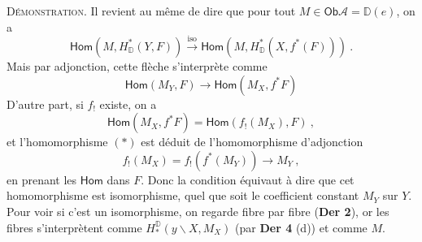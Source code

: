 \documentclass[11pt]{article}
\newcommand{\Ob}{\mathsf{Ob}}
\newcommand{\DD}{\mathbb{D}}
\newcommand{\sHom}{\mathsf{Hom}}
\newcommand{\cA}{\mathcal{A}}
\begin{document}
\noindent\textsc{Démonstration}. Il revient au même de dire que pour tout $M \in \Ob \cA = \DD(e)$, on a
\[
\sHom(M, H^*_{\DD}(Y, F)) \overset{\mathrm{iso}}{\longrightarrow} \sHom(M, H^*_{\DD}(X, f^*(F))) \ .
\]
Mais par adjonction, cette flèche s'interprète comme
\[
\sHom(M_Y, F) \longrightarrow \sHom(M_X, f^*F) \tag*{$(*)$}
\]
D'autre part, si $f_!$ existe, on a
\[
\sHom(M_X, f^*F) = \sHom(f_!(M_X), F) \ ,
\]
et l'homomorphisme $(*)$ est déduit de l'homomorphisme d'adjonction
\[
f_!(M_X) = f_!(f^*(M_Y)) \longrightarrow M_Y \ , \tag*{$(**)$}
\]
en prenant les $\sHom$ dans $F$. Donc la condition équivaut à dire que cet homomorphisme est isomorphisme, quel que soit le coefficient constant $M_Y$ sur $Y$. Pour voir si c'est un isomorphisme, on regarde fibre par fibre (\textbf{Der 2}), or les fibres s'interprètent comme $H^{\DD}_*(y\backslash X, M_X)$ (par \textbf{Der 4} (d)) et comme $M$.
\end{document}
